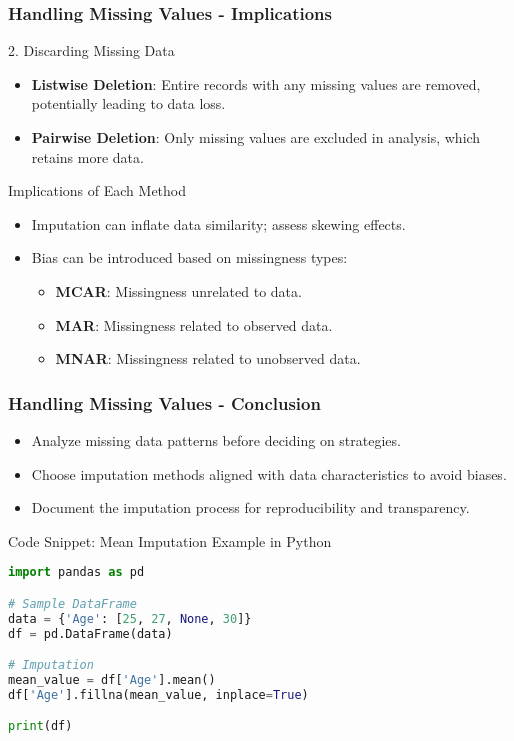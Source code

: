 \documentclass[aspectratio=169]{beamer}
\begin{document}
\begin{frame}[fragile]
    \frametitle{Handling Missing Values - Implications}
    \begin{block}{2. Discarding Missing Data}
        \begin{itemize}
            \item \textbf{Listwise Deletion}: Entire records with any missing values are removed, potentially leading to data loss.
            \item \textbf{Pairwise Deletion}: Only missing values are excluded in analysis, which retains more data.
        \end{itemize}
    \end{block}
    
    \begin{block}{Implications of Each Method}
        \begin{itemize}
            \item Imputation can inflate data similarity; assess skewing effects.
            \item Bias can be introduced based on missingness types:
            \begin{itemize}
                \item \textbf{MCAR}: Missingness unrelated to data.
                \item \textbf{MAR}: Missingness related to observed data.
                \item \textbf{MNAR}: Missingness related to unobserved data.
            \end{itemize}
        \end{itemize}
    \end{block}
\end{frame}

\begin{frame}[fragile]
    \frametitle{Handling Missing Values - Conclusion}
    \begin{itemize}
        \item Analyze missing data patterns before deciding on strategies.
        \item Choose imputation methods aligned with data characteristics to avoid biases.
        \item Document the imputation process for reproducibility and transparency.
    \end{itemize}
    
    \begin{block}{Code Snippet: Mean Imputation Example in Python}
        \begin{lstlisting}[language=Python]
import pandas as pd

# Sample DataFrame
data = {'Age': [25, 27, None, 30]}
df = pd.DataFrame(data)

# Imputation
mean_value = df['Age'].mean()
df['Age'].fillna(mean_value, inplace=True)

print(df)
        \end{lstlisting}
    \end{block}
\end{frame}
\end{document}
